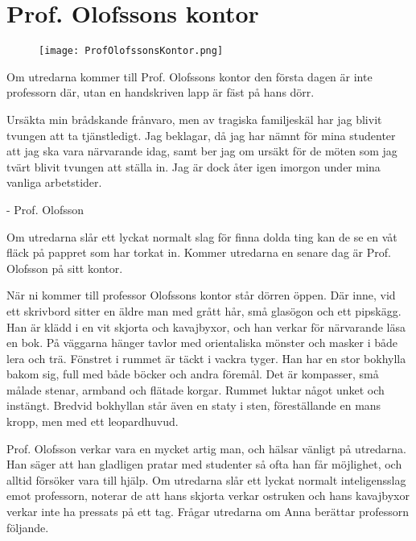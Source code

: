 \section{Prof. Olofssons kontor}
\label{loc:OlofssonsKontor}
%
\begin{figure}[h]
\texttt{[image: ProfOlofssonsKontor.png]}
\centering
\end{figure}
%
Om utredarna kommer till Prof. Olofssons kontor den första dagen är inte professorn där, utan en handskriven lapp är fäst på hans dörr.

\begin{displayquote}
	Ursäkta min brådskande frånvaro, men av tragiska familjeskäl har jag blivit tvungen att ta tjänstledigt. Jag beklagar, då jag har nämnt för mina studenter att jag ska vara närvarande idag, samt ber jag om ursäkt för de möten som jag tvärt blivit tvungen att ställa in. Jag är dock åter igen imorgon under mina vanliga arbetstider.

	- Prof. Olofsson
\end{displayquote}
%
Om utredarna slår ett lyckat normalt slag för finna dolda ting kan de se en våt fläck på pappret som har torkat in. Kommer utredarna en senare dag är Prof. Olofsson på sitt kontor.

\begin{displayquote}
	När ni kommer till professor Olofssons kontor står dörren öppen. Där inne, vid ett skrivbord sitter en äldre man med grått hår, små glasögon och ett pipskägg. Han är klädd i en vit skjorta och kavajbyxor, och han verkar för närvarande läsa en bok. På väggarna hänger tavlor med orientaliska mönster och masker i både lera och trä. Fönstret i rummet är täckt i vackra tyger. Han har en stor bokhylla bakom sig, full med både böcker och andra föremål. Det är kompasser, små målade stenar, armband och flätade korgar. Rummet luktar något unket och instängt. Bredvid bokhyllan står även en staty i sten, föreställande en mans kropp, men med ett leopardhuvud.
\end{displayquote}
%
Prof. Olofsson \sectiondescribe{\ref{kar:TomasOlofsson}} verkar vara en mycket artig man, och hälsar vänligt på utredarna. Han säger att han gladligen pratar med studenter så ofta han får möjlighet, och alltid försöker vara till hjälp. Om utredarna slår ett lyckat normalt inteligensslag emot professorn, noterar de att hans skjorta verkar ostruken och hans kavajbyxor verkar inte ha pressats på ett tag. Frågar utredarna om Anna berättar professorn följande.

